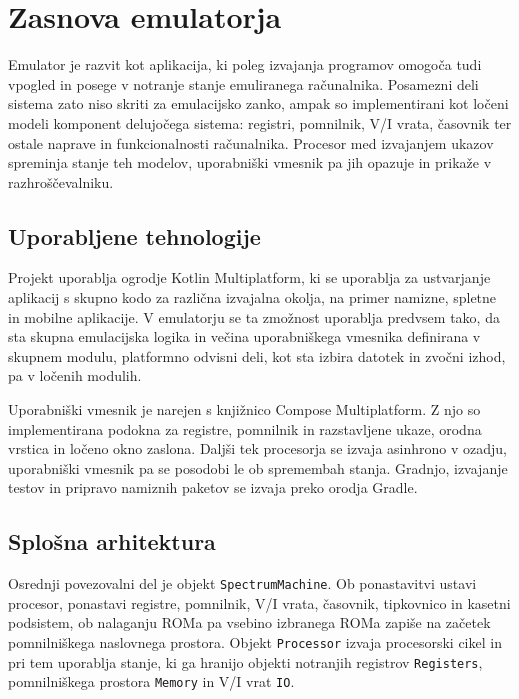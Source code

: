 \documentclass[a4paper, 12pt, openright]{book}
\begin{document}
    \chapter{Zasnova emulatorja}
    \label{zasnovazgradba}

    Emulator je razvit kot aplikacija, ki poleg izvajanja programov omogoča tudi vpogled
    in posege v notranje stanje emuliranega računalnika. Posamezni deli sistema
    zato niso skriti za emulacijsko zanko, ampak so implementirani kot ločeni modeli
    komponent delujočega sistema: registri, pomnilnik, V/I vrata, časovnik ter ostale
    naprave in funkcionalnosti računalnika. Procesor med izvajanjem ukazov
    spreminja stanje teh modelov, uporabniški vmesnik pa jih opazuje in prikaže v
    razhroščevalniku.

    \section{Uporabljene tehnologije}

    Projekt uporablja ogrodje Kotlin Multiplatform, ki se uporablja za ustvarjanje
    aplikacij s skupno kodo za različna izvajalna okolja, na primer namizne, spletne
    in mobilne aplikacije. V emulatorju se ta zmožnost uporablja predvsem tako, da
    sta skupna emulacijska logika in večina uporabniškega vmesnika definirana v skupnem
    modulu, platformno odvisni deli, kot sta izbira datotek in zvočni izhod, pa
    v ločenih modulih.

    Uporabniški vmesnik je narejen s knjižnico Compose Multiplatform. Z njo so implementirana
    podokna za registre, pomnilnik in razstavljene ukaze, orodna vrstica in ločeno
    okno zaslona. Daljši tek procesorja se izvaja asinhrono v ozadju, uporabniški
    vmesnik pa se posodobi le ob spremembah stanja. Gradnjo, izvajanje testov in pripravo
    namiznih paketov se izvaja preko orodja Gradle.

    \section{Splošna arhitektura}

    Osrednji povezovalni del je objekt \texttt{SpectrumMachine}. Ob ponastavitvi
    ustavi procesor, ponastavi registre, pomnilnik, V/I vrata, časovnik, tipkovnico
    in kasetni podsistem, ob nalaganju ROMa pa vsebino izbranega ROMa zapiše na
    začetek pomnilniškega naslovnega prostora. Objekt \texttt{Processor} izvaja
    procesorski cikel in pri tem uporablja stanje, ki ga hranijo objekti notranjih
    registrov \texttt{Registers}, pomnilniškega prostora \texttt{Memory} in V/I
    vrat \texttt{IO}.
\end{document}
